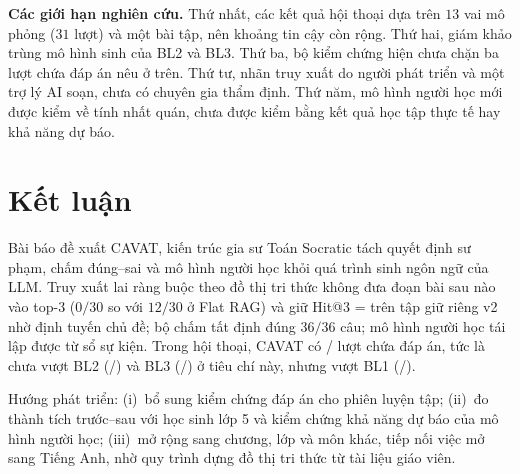 \documentclass[10pt,a4paper,twocolumn]{article}
\begin{document}
\textbf{Các giới hạn nghiên cứu.} Thứ nhất, các kết quả hội thoại dựa trên $13$ vai mô phỏng ($31$ lượt) và một bài tập, nên khoảng tin cậy còn rộng. Thứ hai, giám khảo trùng mô hình sinh của BL2 và BL3. Thứ ba, bộ kiểm chứng hiện chưa chặn ba lượt chứa đáp án nêu ở trên. Thứ tư, nhãn truy xuất do người phát triển và một trợ lý AI soạn, chưa có chuyên gia thẩm định. Thứ năm, mô hình người học mới được kiểm về tính nhất quán, chưa được kiểm bằng kết quả học tập thực tế hay khả năng dự báo.

\FloatBarrier
\section{Kết luận}\label{sec:conclusion}
Bài báo đề xuất CAVAT, kiến trúc gia sư Toán Socratic tách quyết định sư phạm, chấm đúng--sai và mô hình người học khỏi quá trình sinh ngôn ngữ của LLM. Truy xuất lai ràng buộc theo đồ thị tri thức không đưa đoạn bài sau nào vào top-3 ($0/30$ so với $12/30$ ở Flat RAG) và giữ Hit@3 = \CavHitThreeVtwo{} trên tập giữ riêng v2 nhờ định tuyến chủ đề; bộ chấm tất định đúng $36/36$ câu; mô hình người học tái lập được từ sổ sự kiện. Trong hội thoại, CAVAT có \CavLeaks{}/\CavTurns{} lượt chứa đáp án, tức là chưa vượt BL2 (\BtwoLeaks{}/\BtwoTurns{}) và BL3 (\BthreeLeaks{}/\BthreeTurns{}) ở tiêu chí này, nhưng vượt BL1 (\BoneLeaks{}/\BoneTurns{}).

Hướng phát triển: (i)~bổ sung kiểm chứng đáp án cho phiên luyện tập; (ii)~đo thành tích trước--sau với học sinh lớp 5 và kiểm chứng khả năng dự báo của mô hình người học; (iii)~mở rộng sang chương, lớp và môn khác, tiếp nối việc mở sang Tiếng Anh, nhờ quy trình dựng đồ thị tri thức từ tài liệu giáo viên.


\end{document}
